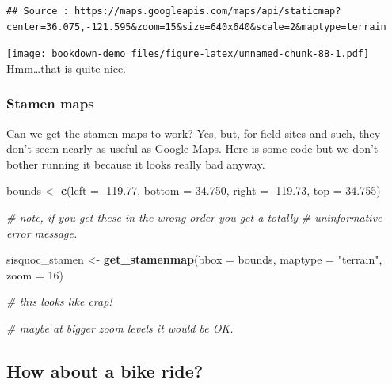 \documentclass[]{book}
\newenvironment{Shaded}{\begin{snugshade}}{\end{snugshade}}
\newcommand{\KeywordTok}[1]{\textcolor[rgb]{0.13,0.29,0.53}{\textbf{{#1}}}}
\newcommand{\DataTypeTok}[1]{\textcolor[rgb]{0.13,0.29,0.53}{{#1}}}
\newcommand{\DecValTok}[1]{\textcolor[rgb]{0.00,0.00,0.81}{{#1}}}
\newcommand{\FloatTok}[1]{\textcolor[rgb]{0.00,0.00,0.81}{{#1}}}
\newcommand{\StringTok}[1]{\textcolor[rgb]{0.31,0.60,0.02}{{#1}}}
\newcommand{\CommentTok}[1]{\textcolor[rgb]{0.56,0.35,0.01}{\textit{{#1}}}}
\newcommand{\NormalTok}[1]{{#1}}
\theoremstyle{definition}
\theoremstyle{definition}
\theoremstyle{remark}
\begin{document}
\begin{verbatim}
## Source : https://maps.googleapis.com/maps/api/staticmap?center=36.075,-121.595&zoom=15&size=640x640&scale=2&maptype=terrain
\end{verbatim}

\texttt{[image: bookdown-demo\_files/figure-latex/unnamed-chunk-88-1.pdf]}
Hmm\ldots{}that is quite nice.

\subsubsection{Stamen maps}\label{stamen-maps}

Can we get the stamen maps to work? Yes, but, for field sites and such,
they don't seem nearly as useful as Google Maps. Here is some code but
we don't bother running it because it looks really bad anyway.

\begin{Shaded}
\begin{Highlighting}[]
\NormalTok{bounds <-}\StringTok{ }\KeywordTok{c}\NormalTok{(}\DataTypeTok{left =} \NormalTok{-}\FloatTok{119.77}\NormalTok{, }
            \DataTypeTok{bottom =} \FloatTok{34.750}\NormalTok{,}
            \DataTypeTok{right =} \NormalTok{-}\FloatTok{119.73}\NormalTok{,}
            \DataTypeTok{top =} \FloatTok{34.755}\NormalTok{)}

\CommentTok{# note, if you get these in the wrong order you get a totally }
\CommentTok{# uninformative error message.}

\NormalTok{sisquoc_stamen <-}\StringTok{ }\KeywordTok{get_stamenmap}\NormalTok{(}\DataTypeTok{bbox =} \NormalTok{bounds, }\DataTypeTok{maptype =} \StringTok{"terrain"}\NormalTok{, }\DataTypeTok{zoom =} \DecValTok{16}\NormalTok{)}

\CommentTok{# this looks like crap!}

\CommentTok{# maybe at bigger zoom levels it would be OK.}
\end{Highlighting}
\end{Shaded}

\subsection{How about a bike ride?}\label{how-about-a-bike-ride}
\end{document}
